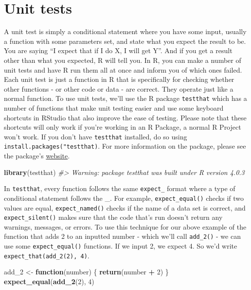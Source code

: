 \documentclass[
  12pt,
]{book}
\newenvironment{Shaded}{\begin{snugshade}}{\end{snugshade}}
\newcommand{\CommentTok}[1]{\textcolor[rgb]{0.37,0.37,0.37}{\textit{#1}}}
\newcommand{\ControlFlowTok}[1]{\textcolor[rgb]{0.27,0.27,0.27}{\textbf{#1}}}
\newcommand{\DecValTok}[1]{\textcolor[rgb]{0.06,0.06,0.06}{#1}}
\newcommand{\KeywordTok}[1]{\textcolor[rgb]{0.27,0.27,0.27}{\textbf{#1}}}
\newcommand{\NormalTok}[1]{#1}
\newcommand{\OperatorTok}[1]{\textcolor[rgb]{0.43,0.43,0.43}{\textbf{#1}}}
\newcommand{\StringTok}[1]{\textcolor[rgb]{0.5,0.5,0.5}{#1}}
\begin{document}
\hypertarget{unit-tests}{%
\section{Unit tests}\label{unit-tests}}

A unit test is simply a conditional statement where you have some input, usually a function with some parameters set, and state what you expect the result to be. You are saying ``I expect that if I do X, I will get Y''. And if you get a result other than what you expected, R will tell you. In R, you can make a number of unit tests and have R run them all at once and inform you of which ones failed. Each unit test is just a function in R that is specifically for checking whether other functions - or other code or data - are correct. They operate just like a normal function. To use unit tests, we'll use the R package \texttt{testthat} which has a number of functions that make unit testing easier and use some keyboard shortcuts in RStudio that also improve the ease of testing. Please note that these shortcuts will only work if you're working in an R Package, a normal R Project won't work. If you don't have \texttt{testthat} installed, do so using \texttt{install.packages("testthat)}. For more information on the package, please see the package's \href{https://testthat.r-lib.org/index.html}{website}.

\begin{Shaded}
\begin{Highlighting}[]
\KeywordTok{library}\NormalTok{(testthat)}
\CommentTok{\#\textgreater{} Warning: package \textquotesingle{}testthat\textquotesingle{} was built under R version 4.0.3}
\end{Highlighting}
\end{Shaded}

In \texttt{testthat}, every function follows the same \texttt{expect\_} format where a type of conditional statement follows the \_. For example, \texttt{expect\_equal()} checks if two values are equal, \texttt{expect\_named()} checks if the name of a data set is correct, and \texttt{expect\_silent()} makes sure that the code that's run doesn't return any warnings, messages, or errors. To use this technique for our above example of the function that adds 2 to an inputted number - which we'll call \texttt{add\_2()} - we can use some \texttt{expect\_equal()} functions. If we input 2, we expect 4. So we'd write \texttt{expect\_that(add\_2(2),\ 4)}.

\begin{Shaded}
\begin{Highlighting}[]
\NormalTok{add\_}\DecValTok{2}\NormalTok{ \textless{}{-}}\StringTok{ }\ControlFlowTok{function}\NormalTok{(number) \{ }\KeywordTok{return}\NormalTok{(number }\OperatorTok{+}\StringTok{ }\DecValTok{2}\NormalTok{) \}}
\KeywordTok{expect\_equal}\NormalTok{(}\KeywordTok{add\_2}\NormalTok{(}\DecValTok{2}\NormalTok{), }\DecValTok{4}\NormalTok{)}
\end{Highlighting}
\end{Shaded}
\end{document}
